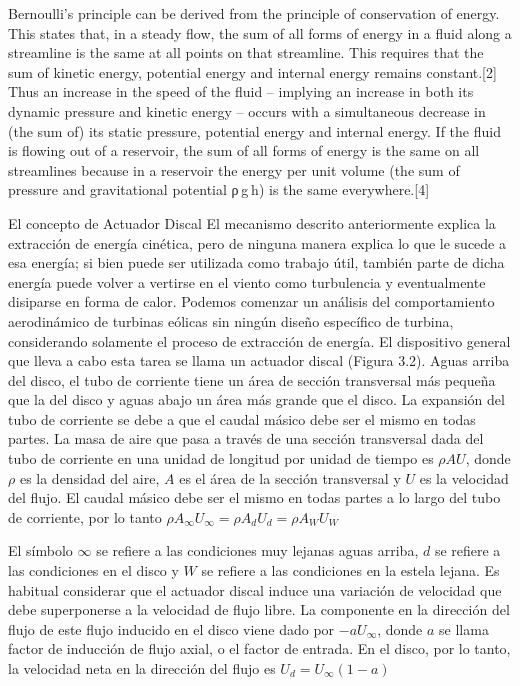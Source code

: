 
Bernoulli's principle can be derived from the principle of conservation of energy. This states that, in a steady flow, the sum of all forms of energy in a fluid along a streamline is the same at all points on that streamline. This requires that the sum of kinetic energy, potential energy and internal energy remains constant.[2] Thus an increase in the speed of the fluid – implying an increase in both its dynamic pressure and kinetic energy – occurs with a simultaneous decrease in (the sum of) its static pressure, potential energy and internal energy. If the fluid is flowing out of a reservoir, the sum of all forms of energy is the same on all streamlines because in a reservoir the energy per unit volume (the sum of pressure and gravitational potential ρ g h) is the same everywhere.[4]


El concepto de Actuador Discal
El mecanismo descrito anteriormente explica la extracción de energía cinética, pero de ninguna manera explica lo que le sucede a esa energía; si bien puede ser utilizada como trabajo útil, también parte de dicha energía puede volver a vertirse en el viento como turbulencia y eventualmente disiparse en forma de calor. Podemos comenzar un análisis del comportamiento aerodinámico de turbinas eólicas sin ningún diseño específico de turbina, considerando solamente el proceso de extracción de energía. El dispositivo general que lleva a cabo esta tarea se llama un actuador discal (Figura 3.2). 
Aguas arriba del disco, el tubo de corriente tiene un área de sección transversal más pequeña que la del disco y aguas abajo un área más grande que el disco. La expansión del tubo de corriente se debe a que el caudal másico debe ser el mismo en todas partes. La masa de aire que pasa a través de una sección transversal dada del tubo de corriente en una unidad de longitud por unidad de tiempo es $\rho AU$, donde $\rho$ es la densidad del aire, $A$ es el área de la sección transversal y $U$ es la velocidad del flujo. El caudal másico debe ser el mismo en todas partes a lo largo del tubo de corriente, por lo tanto
$\rho A_{\infty} U_{\infty} = \rho A_d U_d = \rho A_W U_W$

El símbolo $\infty$ se refiere a las condiciones muy lejanas aguas arriba, $d$ se refiere a las condiciones en el disco y $W$ se refiere a las condiciones en la estela lejana. Es habitual considerar que el actuador discal induce una variación de velocidad que debe superponerse a la velocidad de flujo libre. La componente en la dirección del flujo de este flujo inducido en el disco viene dado por $-aU_{\infty}$, donde $a$ se llama factor de inducción de flujo axial, o el factor de entrada. En el disco, por lo tanto, la velocidad neta en la dirección del flujo
es
$U_d = U_{\infty} (1-a)$




